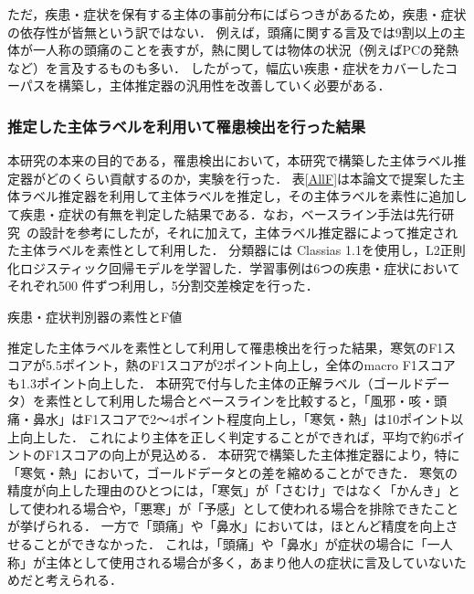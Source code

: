 \documentclass[japanese]{jnlp_1.4}
\begin{document}
ただ，疾患・症状を保有する主体の事前分布にばらつきがあるため，疾患・症状の依存性が皆無という訳ではない．
例えば，頭痛に関する言及では9割以上の主体が一人称の頭痛のことを表すが，熱に関しては物体の状況（例えばPCの発熱など）を言及するものも多い．
したがって，幅広い疾患・症状をカバーしたコーパスを構築し，主体推定器の汎用性を改善していく必要がある．


\subsubsection{推定した主体ラベルを利用いて罹患検出を行った結果}

本研究の本来の目的である，罹患検出において，本研究で構築した主体ラベル推定器がどのくらい貢献するのか，実験を行った．
表\ref{AllF}は本論文で提案した主体ラベル推定器を利用して主体ラベルを推定し，その主体ラベルを素性に追加して疾患・症状の有無を判定した結果である．なお，ベースライン手法は先行研究~\cite{aramaki-maskawa-morita:2011:EMNLP}の設計を参考にしたが，それに加えて，主体ラベル推定器によって推定された主体ラベルを素性として利用した．
分類器には Classias 1.1を使用し，L2正則化ロジスティック回帰モデルを学習した．学習事例は6つの疾患・症状においてそれぞれ500 件ずつ利用し，5分割交差検定を行った．

\begin{table}[b]
\caption{疾患・症状判別器の素性とF値}
\label{AllF}

\end{table}

推定した主体ラベルを素性として利用して罹患検出を行った結果，寒気のF1スコアが5.5ポイント，熱のF1スコアが2ポイント向上し，全体のmacro F1スコアも1.3ポイント向上した．
本研究で付与した主体の正解ラベル（ゴールドデータ）を素性として利用した場合とベースラインを比較すると，「風邪・咳・頭痛・鼻水」はF1スコアで2〜4ポイント程度向上し，「寒気・熱」は10ポイント以上向上した．
これにより主体を正しく判定することができれば，平均で約6ポイントのF1スコアの向上が見込める．
本研究で構築した主体推定器により，特に「寒気・熱」において，ゴールドデータとの差を縮めることができた．
寒気の精度が向上した理由のひとつには，「寒気」が「さむけ」ではなく「かんき」として使われる場合や，「悪寒」が「予感」として使われる場合を排除できたことが挙げられる．
一方で「頭痛」や「鼻水」においては，ほとんど精度を向上させることができなかった．
これは，「頭痛」や「鼻水」が症状の場合に「一人称」が主体として使用される場合が多く，あまり他人の症状に言及していないためだと考えられる．
\end{document}
